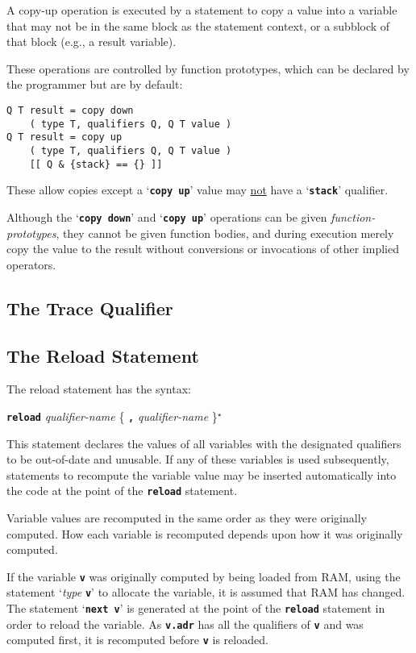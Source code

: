 \documentclass[12pt]{article}
\makeatletter
\newcommand{\TT}[1]{{\tt \bfseries #1}}
\newcommand{\ttkey}[1]{\TT{#1}\index{#1@{\tt #1}}}
\newcommand{\STAR}{{\Large $^\star$}}
\newenvironment{indpar}[1][0.3in]%
	{\begin{list}{}%
		     {\setlength{\itemsep}{0in}%
		      \setlength{\topsep}{0in}%
		      \setlength{\parsep}{1ex}%
		      \setlength{\labelwidth}{#1}%
		      \setlength{\leftmargin}{#1}%
		      \addtolength{\leftmargin}{\labelsep}}%
	 \item}%
	{\end{list}}
\makeatother
\begin{document}
A copy-up operation is executed by a statement to copy
a value into a variable that may not be in the same block
as the statement context, or a subblock of that block
(e.g., a result variable).

These operations are controlled by function prototypes,
which can be declared by the programmer but are by default:

\begin{indpar}\begin{verbatim}
Q T result = copy down
    ( type T, qualifiers Q, Q T value )
Q T result = copy up
    ( type T, qualifiers Q, Q T value )
    [[ Q & {stack} == {} ]]
\end{verbatim}\end{indpar}

These allow copies except a `\TT{copy up}' value may
\underline{not} have a `\TT{stack}' qualifier.

Although the `\TT{copy down}' and `\TT{copy up}' operations
can be given {\em function-prototypes}, they cannot be given
function bodies, and during execution merely copy the value to
the result without conversions or invocations of other implied
operators.

\subsection{The Trace Qualifier}
\label{THE-TRACE-QUALIFIER}

\subsection{The Reload Statement}
\label{THE-RELOAD-COMMAND}

The reload statement has the syntax:
\begin{center}
\ttkey{reload} {\em qualifier-name} \{ \TT{,} {\em qualifier-name} \}\STAR{}
\end{center}

This statement declares the values of all variables with the designated
qualifiers to be out-of-date and unusable.  If any of these variables
is used subsequently, statements to recompute the variable value
may be inserted automatically into the code at the point of the
\TT{reload} statement.

Variable values are recomputed in the same order as they were
originally computed.  How each variable is recomputed depends upon
how it was originally computed.

If the variable \TT{v} was originally computed by being loaded from
RAM, using the statement `{\em type} \TT{v}' to allocate the variable,
it is assumed that RAM has changed.  The statement `\TT{next v}' is
generated at the point of the \TT{reload} statement in order
to reload the variable.  As \TT{v.adr}
has all the qualifiers of \TT{v} and was 
computed first, it is recomputed before \TT{v} is reloaded.
\end{document}
